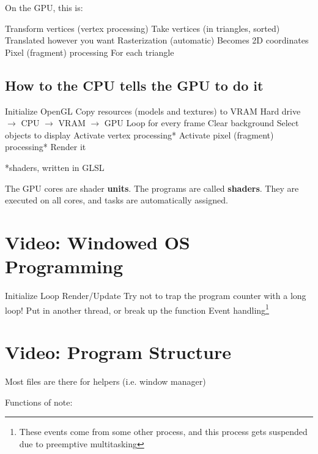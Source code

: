 On the GPU, this is:

\begin{outline}[enumerate]
    \1 Transform vertices (vertex processing)
        \2 Take vertices (in triangles, sorted)
        \2 Translated however you want
    \1 Rasterization (automatic)
        \2 Becomes 2D coordinates
    \1 Pixel (fragment) processing
        \2 For each triangle
\end{outline}

\subsection{How to the CPU tells the GPU to do it}

\begin{outline}[enumerate]
    \1 Initialize OpenGL
    \1 Copy resources (models and textures) to VRAM
        \2 Hard drive $\rightarrow$ CPU $\rightarrow$ VRAM $\rightarrow$ GPU
    \1 Loop for every frame
        \2 Clear background
        \2 Select objects to display
        \2 Activate vertex processing*
        \2 Activate pixel (fragment) processing*
        \2 Render it
\end{outline}

*shaders, written in GLSL

The GPU cores are shader \textbf{units}. The programs are called \textbf{shaders}. They are executed on all cores, and tasks are automatically assigned.

\section{Video: Windowed OS Programming}

\begin{outline}
    \1 Initialize 
    \1 Loop
        \2 Render/Update
            \3 Try not to trap the program counter with a long loop! Put in another thread, or break up the function
        \2 Event handling\footnote{These events come from some other process, and this process gets suspended due to preemptive multitasking}
\end{outline}

\section{Video: Program Structure}

Most files are there for helpers (i.e. window manager)

Functions of note:

